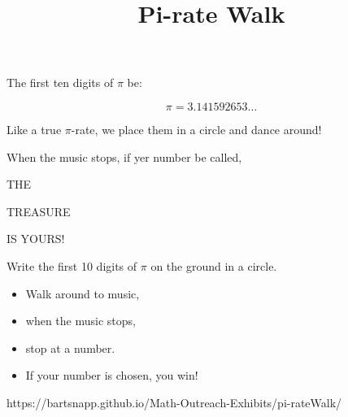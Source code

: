 \documentclass{../exhibit}
\title{Pi-rate Walk}
\begin{document}
\begin{context}
  The first ten digits of $\pi$ be:

  \[
  \pi=3.141592653\dots
  \]

  Like a true $\pi$-rate, we place them in a circle and dance around!


  When the music stops, if yer number be called,



  THE

  \qquad TREASURE

  
  \qquad \qquad \qquad  IS YOURS!
\end{context}



\begin{directions}

  Write the first 10 digits of $\pi$ on the ground in a circle.
  \begin{itemize}
    \item Walk around to music,
    \item when the music stops,
    \item stop at a number.
    \item If your number is chosen, you win!
  \end{itemize}
  \end{directions}



\begin{example}\HUGE
  \begin{center}
  \end{center}
\end{example}



\begin{mathConnections}
  https://bartsnapp.github.io/Math-Outreach-Exhibits/pi-rateWalk/
\end{mathConnections}
\end{document}
